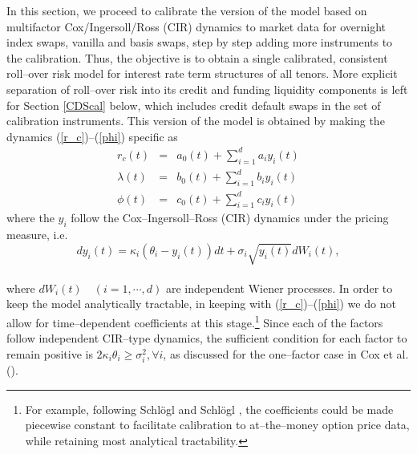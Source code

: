 \documentclass[12pt,a4paper]{article}
\renewcommand{\cite}{\citeyear}
\theoremstyle{plain}
\numberwithin{equation}{section}
\begin{document}
In this section, we proceed to calibrate the version of the model based on multifactor Cox/Ingersoll/Ross (CIR) dynamics to market data for overnight index swaps, vanilla and basis swaps, step by step adding more instruments to the calibration. Thus, the objective is to obtain a single calibrated, consistent roll--over risk model for interest rate term structures of all tenors. More explicit separation of roll--over risk into its credit and funding liquidity components is left for Section \ref{CDScal} below, which includes credit default swaps in the set of calibration instruments. This version of the model is obtained by making the dynamics (\ref{r_c})--(\ref{phi}) specific as
\begin{eqnarray}
r_c(t)    &=& a_0(t)+\sum_{i=1}^{d} a_iy_{i}(t)\label{r_cspec}\\
\lambda(t) &=& b_0(t)+\sum_{i=1}^{d} b_iy_{i}(t)\label{lambdaspec}\\
\phi(t)    &=& c_0(t)+\sum_{i=1}^{d} c_iy_{i}(t)\label{phispec}
\end{eqnarray}
where the $y_{i}$ follow the Cox--Ingersoll--Ross (CIR) dynamics under the pricing measure, i.e. \\
\begin{equation}
dy_{i}(t) = \kappa_{i}(\theta_{i} -y_{i}(t)) dt + \sigma_{i}\sqrt{y_{i}(t)} dW_{i}(t),\label{dy_i}
\end{equation}\\
where $dW_{i}(t) \quad (i = 1, \cdots, d)$ are independent Wiener processes. In order to keep the model analytically tractable, in keeping with (\ref{r_c})--(\ref{phi}) we do not allow for time--dependent coefficients at this stage.\footnote{For example, following Schl\"ogl and Schl\"ogl \cite{OZ:Sch&Sch:00}, the coefficients could be made piecewise constant to facilitate calibration to at--the--money option price data, while retaining most analytical tractability.} Since each of the factors follow independent CIR--type dynamics, the sufficient condition for each factor to remain positive is $2\kappa_{i}\theta_{i}\geq \sigma_{i}^{2}, \forall i$, as discussed for the one--factor case in Cox et al. (\citeyear*{CIR1985}).
\end{document}
